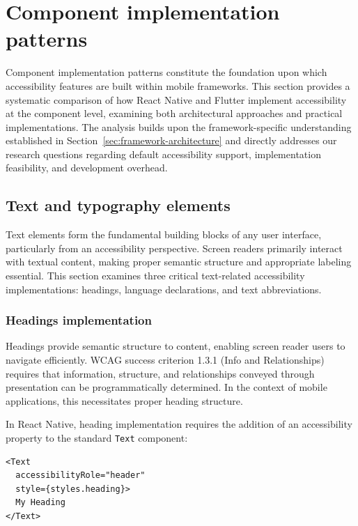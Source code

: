 \section{Component implementation patterns}
\label{sec:component-implementation}

Component implementation patterns constitute the foundation upon which accessibility features are built within mobile frameworks. This section provides a systematic comparison of how React Native and Flutter implement accessibility at the component level, examining both architectural approaches and practical implementations. The analysis builds upon the framework-specific understanding established in Section~\ref{sec:framework-architecture} and directly addresses our research questions regarding default accessibility support, implementation feasibility, and development overhead.

\subsection{Text and typography elements}
\label{subsec:text-typography}

Text elements form the fundamental building blocks of any user interface, particularly from an accessibility perspective. Screen readers primarily interact with textual content, making proper semantic structure and appropriate labeling essential. This section examines three critical text-related accessibility implementations: headings, language declarations, and text abbreviations.

\subsubsection{Headings implementation}
\label{subsubsec:headings-implementation}

Headings provide semantic structure to content, enabling screen reader users to navigate efficiently. WCAG success criterion 1.3.1 (Info and Relationships) requires that information, structure, and relationships conveyed through presentation can be programmatically determined. In the context of mobile applications, this necessitates proper heading structure.

In React Native, heading implementation requires the addition of an accessibility property to the standard \texttt{Text} component:

\begin{lstlisting}[style=ReactNativeStyle, caption=Heading implementation in React Native, label=lst:react-native-heading]
<Text
  accessibilityRole="header"
  style={styles.heading}>
  My Heading
</Text>
\end{lstlisting}

